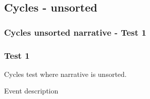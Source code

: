 \documentclass[8pt]{beamer}
\begin{document}
\subsection{Cycles - unsorted}
\begin{frame}
    \frametitle{Cycles unsorted narrative - Test 1}
    \subsubsection{Test 1}
    \small
    Cycles test where narrative is unsorted.\linebreak
    \begin{minipage}{0.4\linewidth}
        \begin{table}[t!]
            \caption{Event description}
            \begin{center}


\end{center}
\end{table}
\end{minipage}
\end{frame}
\end{document}
